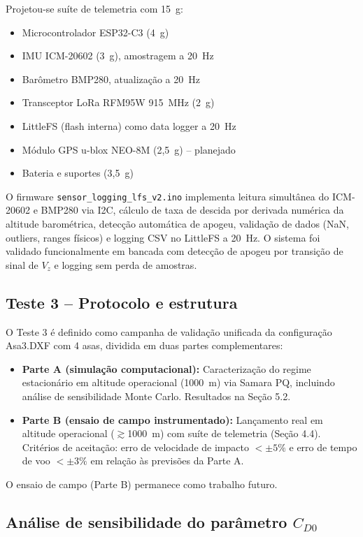 \documentclass[12pt,fleqn]{article}
\begin{document}
Projetou-se suíte de telemetria com 15~g:

\begin{itemize}
  \item Microcontrolador ESP32-C3 (4~g)
  \item IMU ICM-20602 (3~g), amostragem a 20~Hz
  \item Barômetro BMP280, atualização a 20~Hz
  \item Transceptor LoRa RFM95W 915~MHz (2~g)
  \item LittleFS (flash interna) como data logger a 20~Hz
  \item Módulo GPS u-blox NEO-8M (2,5~g) -- planejado
  \item Bateria e suportes (3,5~g)
\end{itemize}

O firmware \texttt{sensor\_logging\_lfs\_v2.ino} implementa leitura simultânea do ICM-20602 e BMP280 via I2C, cálculo de taxa de descida por derivada numérica da altitude barométrica, detecção automática de apogeu, validação de dados (NaN, outliers, ranges físicos) e logging CSV no LittleFS a 20~Hz. O sistema foi validado funcionalmente em bancada com detecção de apogeu por transição de sinal de $V_z$ e logging sem perda de amostras.

\subsection{Teste 3 -- Protocolo e estrutura}

O Teste 3 é definido como campanha de validação unificada da configuração Asa3.DXF com 4 asas, dividida em duas partes complementares:

\begin{itemize}
  \item \textbf{Parte A (simulação computacional):} Caracterização do regime estacionário em altitude operacional (1000~m) via Samara PQ, incluindo análise de sensibilidade Monte Carlo. Resultados na Seção 5.2.
  \item \textbf{Parte B (ensaio de campo instrumentado):} Lançamento real em altitude operacional ($\gtrsim$1000~m) com suíte de telemetria (Seção 4.4). Critérios de aceitação: erro de velocidade de impacto $< \pm 5\%$ e erro de tempo de voo $< \pm 3\%$ em relação às previsões da Parte A.
\end{itemize}

O ensaio de campo (Parte B) permanece como trabalho futuro.

\subsection{Análise de sensibilidade do parâmetro $C_{D0}$}
\end{document}

